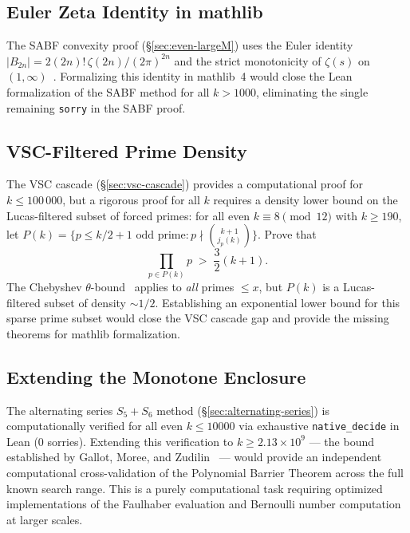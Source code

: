 \documentclass[12pt,a4paper]{article}
\theoremstyle{plain}
\theoremstyle{definition}
\begin{document}
\subsection{Euler Zeta Identity in mathlib}
\label{sec:future-euler}

The SABF convexity proof (\S\ref{sec:even-largeM}) uses the Euler identity
$|B_{2n}| = 2(2n)!\,\zeta(2n)/(2\pi)^{2n}$ and the strict monotonicity
of $\zeta(s)$ on $(1,\infty)$~\cite{Euler}.
Formalizing this identity in mathlib~4 would close the Lean formalization
of the SABF method for all $k > 1000$, eliminating the single remaining
\texttt{sorry} in the SABF proof.

\subsection{VSC-Filtered Prime Density}
\label{sec:future-vsc}

The VSC cascade (\S\ref{sec:vsc-cascade}) provides a computational proof
for $k \le 100\,000$, but a rigorous proof for all $k$ requires a density
lower bound on the Lucas-filtered subset of forced primes:
for all even $k \equiv 8 \pmod{12}$ with $k \ge 190$,
let $P(k) = \{p \le k/2+1 \text{ odd prime} : p \nmid \binom{k+1}{j_p(k)}\}$.
Prove that
\[
  \prod_{p \in P(k)} p \; > \; \frac{3}{2}(k+1).
\]
The Chebyshev $\theta$-bound~\cite{Chebyshev} applies to \emph{all}
primes $\le x$, but $P(k)$ is a Lucas-filtered subset of density $\sim 1/2$.
Establishing an exponential lower bound for this sparse prime subset
would close the VSC cascade gap and provide the missing theorems for
mathlib formalization.

\subsection{Extending the Monotone Enclosure}
\label{sec:future-monotone}

The alternating series $S_5+S_6$ method (\S\ref{sec:alternating-series}) is
computationally verified for all even $k \le 10000$ via exhaustive
\texttt{native\_decide} in Lean (0 sorries).  Extending this verification
to $k \ge 2.13 \times 10^9$ --- the bound established by Gallot, Moree,
and Zudilin~\cite{Gallot} --- would provide an independent computational
cross-validation of the Polynomial Barrier Theorem across the full known
search range.  This is a purely computational task requiring optimized
implementations of the Faulhaber evaluation and Bernoulli number computation
at larger scales.
\end{document}
